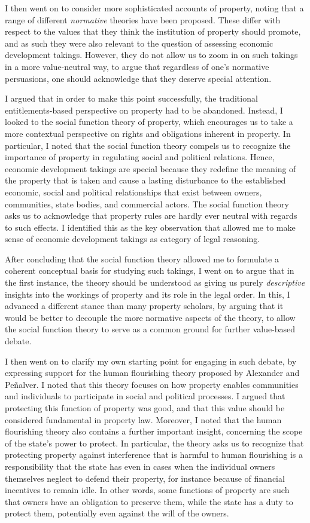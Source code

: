 I then went on to consider more sophisticated accounts of property, noting that a range of different {\it normative} theories have been proposed. These differ with respect to the values that they think the institution of property should promote, and as such they were also relevant to the question of assessing economic development takings. However, they do not allow us to zoom in on such takings in a more value-neutral way, to argue that regardless of one's normative persuasions, one should acknowledge that they deserve special attention.

I argued that in order to make this point successfully, the traditional entitlements-based perspective on property had to be abandoned. Instead, I looked to the social function theory of property, which encourages us to take a more contextual perspective on rights and obligations inherent in property. In particular, I noted that the social function theory compels us to recognize the importance of property in regulating social and political relations. Hence, economic development takings are special because they redefine the meaning of the property that is taken and cause a lasting disturbance to the established economic, social and political relationships that exist between owners, communities, state bodies, and commercial actors. The social function theory asks us to acknowledge that property rules are hardly ever neutral with regards to such effects. I identified this as the key observation that allowed me to make sense of economic development takings as category of legal reasoning.

After concluding that the social function theory allowed me to formulate a coherent conceptual basis for studying such takings, I went on to argue that in the first instance, the theory should be understood as giving us purely {\it descriptive} insights into the workings of property and its role in the legal order. In this, I advanced a different stance than many property scholars, by arguing that it would be better to decouple the more normative aspects of the theory, to allow the social function theory to serve as a common ground for further value-based debate.

I then went on to clarify my own starting point for engaging in such debate, by expressing support for the human flourishing theory proposed by Alexander and Pe\~{n}alver. I noted that this theory focuses on how property enables communities and individuals to  participate in social and political processes. I argued that protecting this function of property was good, and that this value should be considered fundamental in property law. Moreover, I noted that the human flourishing theory also contains a further important insight, concerning the scope of the state's power to protect. In particular, the theory asks us to recognize that protecting property against interference that is harmful to human flourishing is a responsibility that the state has even in cases when the individual owners themselves neglect to defend their property, for instance because of financial incentives to remain idle. In other words, some functions of property are such that owners have an obligation to preserve them, while the state has a duty to protect them, potentially even against the will of the owners.

